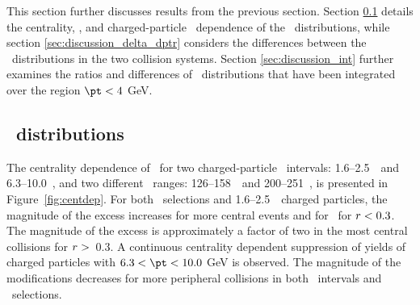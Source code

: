
This section further discusses results from the previous section. Section \ref{sec:discussion_Rdptr} details the centrality, \ptjet, and charged-particle \pt\ dependence of the \RDptr\ distributions, while section \ref{sec:discussion_delta_dptr} considers the differences between the \Dptr\ distributions in the two collision systems. Section \ref{sec:discussion_int} further examines the ratios and differences of \Dptr\ distributions that have been integrated over the region $\pt < 4$ GeV.

\subsection{\RDptr\ distributions}
\label{sec:discussion_Rdptr}

The centrality dependence of \RDptr\ for two charged-particle \pt\ intervals: 1.6--2.5~\GeV\ and \mbox{6.3--10.0~\GeV}, and two different \ptjet\ ranges: 126--158~\GeV\ and 200--251~\GeV, is presented in Figure~\ref{fig:centdep}. 
For both \ptjet\ selections and  1.6--2.5~\GeV\ charged particles, the magnitude of the excess increases
for more central events and for \rvar\ for $\mbox{$r$} < 0.3$.  The magnitude of the excess is
approximately a factor of two in the most central collisions for $\mbox{$r$} >$~0.3.
A continuous centrality dependent suppression of  yields of charged particles with $6.3 < \pt < 10.0$ GeV is observed.
The magnitude of the modifications decreases for more peripheral collisions in both \pt\ 
intervals and \ptjet\ selections.

